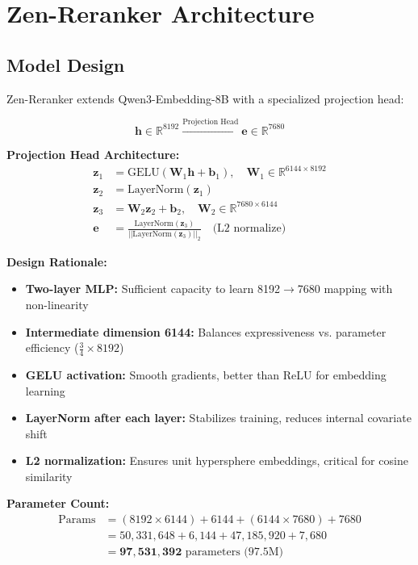 \section{Zen-Reranker Architecture}


\subsection{Model Design}

Zen-Reranker extends Qwen3-Embedding-8B with a specialized projection head:

\begin{equation}
\mathbf{h} \in \mathbb{R}^{8192} \xrightarrow{\text{Projection Head}} \mathbf{e} \in \mathbb{R}^{7680}
\end{equation}

\textbf{Projection Head Architecture:}
\begin{align}
\mathbf{z}_1 &= \text{GELU}(\mathbf{W}_1 \mathbf{h} + \mathbf{b}_1), \quad \mathbf{W}_1 \in \mathbb{R}^{6144 \times 8192} \\
\mathbf{z}_2 &= \text{LayerNorm}(\mathbf{z}_1) \\
\mathbf{z}_3 &= \mathbf{W}_2 \mathbf{z}_2 + \mathbf{b}_2, \quad \mathbf{W}_2 \in \mathbb{R}^{7680 \times 6144} \\
\mathbf{e} &= \frac{\text{LayerNorm}(\mathbf{z}_3)}{||\text{LayerNorm}(\mathbf{z}_3)||_2} \quad \text{(L2 normalize)}
\end{align}

\textbf{Design Rationale:}
\begin{itemize}
\item \textbf{Two-layer MLP:} Sufficient capacity to learn 8192$\to$7680 mapping with non-linearity
\item \textbf{Intermediate dimension 6144:} Balances expressiveness vs. parameter efficiency ($\frac{3}{4} \times 8192$)
\item \textbf{GELU activation:} Smooth gradients, better than ReLU for embedding learning
\item \textbf{LayerNorm after each layer:} Stabilizes training, reduces internal covariate shift
\item \textbf{L2 normalization:} Ensures unit hypersphere embeddings, critical for cosine similarity
\end{itemize}

\textbf{Parameter Count:}
\begin{align}
\text{Params} &= (8192 \times 6144) + 6144 + (6144 \times 7680) + 7680 \\
&= 50,331,648 + 6,144 + 47,185,920 + 7,680 \\
&= \mathbf{97,531,392} \text{ parameters (97.5M)}
\end{align}


